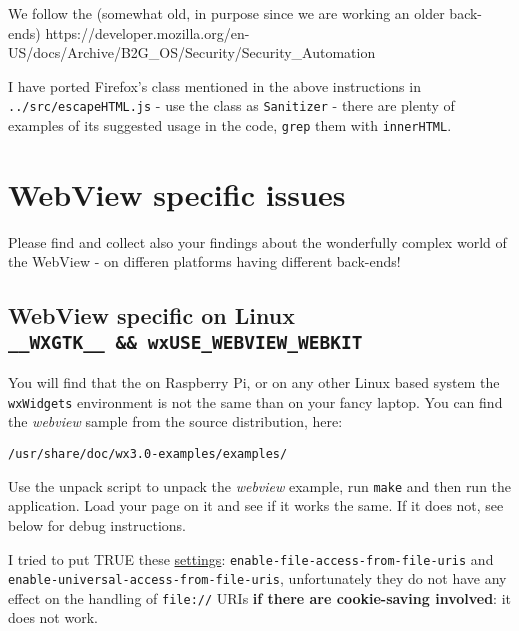 \documentclass[11pt]{article}
\begin{document}
    We follow the (somewhat old, in purpose since we are working an older
back-ends)
https://developer.mozilla.org/en-US/docs/Archive/B2G\_OS/Security/Security\_Automation

    I have ported Firefox's class mentioned in the above instructions in
\texttt{../src/escapeHTML.js} - use the class as \texttt{Sanitizer} -
there are plenty of examples of its suggested usage in the code,
\texttt{grep} them with \texttt{innerHTML}.

    \hypertarget{webview-specific-issues}{%
\section{WebView specific issues}\label{webview-specific-issues}}

    Please find and collect also your findings about the wonderfully complex
world of the WebView - on differen platforms having different back-ends!

    \hypertarget{webview-specific-on-linux-__wxgtk__-wxuse_webview_webkit}{%
\subsection{\texorpdfstring{WebView specific on Linux
\texttt{\_\_WXGTK\_\_\ \&\&\ wxUSE\_WEBVIEW\_WEBKIT}}{WebView specific on Linux \_\_WXGTK\_\_ \&\& wxUSE\_WEBVIEW\_WEBKIT}}\label{webview-specific-on-linux-__wxgtk__-wxuse_webview_webkit}}

    You will find that the on Raspberry Pi, or on any other Linux based
system the \texttt{wxWidgets} environment is not the same than on your
fancy laptop. You can find the \emph{webview} sample from the source
distribution, here:

\begin{verbatim}
/usr/share/doc/wx3.0-examples/examples/
\end{verbatim}

Use the unpack script to unpack the \emph{webview} example, run
\texttt{make} and then run the application. Load your page on it and see
if it works the same. If it does not, see below for debug instructions.

    I tried to put TRUE these
\href{https://webkitgtk.org/reference/webkitgtk/2.4.10/webkitgtk-webkitwebview.html}{settings}:
\texttt{enable-file-access-from-file-uris} and
\texttt{enable-universal-access-from-file-uris}, unfortunately they do
not have any effect on the handling of \texttt{file://} URIs \textbf{if
there are cookie-saving involved}: it does not work.
\end{document}
